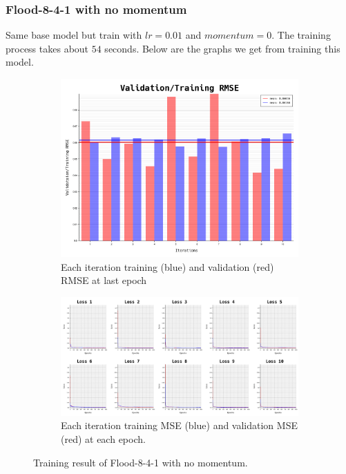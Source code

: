 \documentclass{article}
\begin{document}
\newpage
\subsubsection*{Flood-8-4-1 with no momentum}
Same base model but train with $lr = 0.01$ and $momentum = 0$.
The training process takes about $54$ seconds.
Below are the graphs we get from training this model. 
\begin{figure}[ht]
	\begin{subfigure}{\textwidth}
		\centering
		\includegraphics[scale=0.3]{flood-8-4-1_2/cv_l}
		\caption{Each iteration training (blue) and validation (red) RMSE at last epoch}
		\label{fig:3a}
	\end{subfigure}
	\begin{subfigure}{\textwidth}
		\includegraphics[width=\textwidth]{flood-8-4-1_2/loss}
		\caption{Each iteration training MSE (blue) and validation MSE (red) at each epoch.}
		\label{fig:3b}
	\end{subfigure}
	\caption{Training result of Flood-8-4-1 with no momentum.}
	\label{fig:3}
\end{figure}
\FloatBarrier
\end{document}
